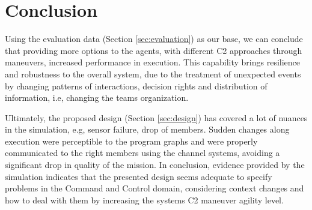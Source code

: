 \section{Conclusion}
\label{sec:conclusion}

Using the evaluation data (Section \ref{sec:evaluation}) as our base, we can conclude that providing more options to the agents, with different C2 approaches through maneuvers, increased performance in execution. This capability brings resilience and robustness to the overall system, due to the treatment of unexpected events by changing patterns of interactions, decision rights and distribution of information, i.e, changing the teams organization.

Ultimately, the proposed design (Section \ref{sec:design}) has covered a lot of nuances in the simulation, e.g, sensor failure, drop of members. Sudden changes along execution were perceptible to the program graphs and were properly communicated to the right members using the channel systems, avoiding a significant drop in quality of the mission. In conclusion, evidence provided by the simulation indicates that the presented design seems adequate to specify problems in the Command and Control domain, considering context changes and how to deal with them by increasing the systems C2 maneuver agility level.
